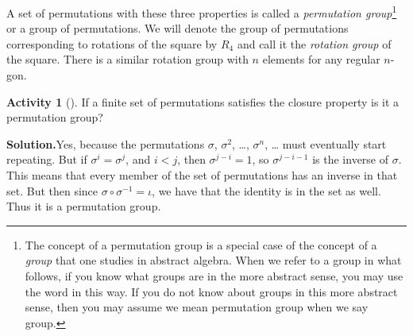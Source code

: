 \documentclass[10pt,]{book}
\theoremstyle{plain}
\theoremstyle{definition}
\newtheorem{activity}[project]{Activity}
\numberwithin{equation}{chapter}
\newcommand{\lt}{<}
\begin{document}
%
\par
A set of permutations with these three properties is called a \emph{permutation group}\footnote{The concept of a permutation group is a special case of the concept of a \emph{group} that one studies in abstract algebra.  When we refer to a group in what follows, if you  know what groups are in the more abstract sense, you may use the word in this way. If you do not know about groups in this more abstract sense, then you may assume we mean permutation group when we say group.\label{fn-18}} or a group of permutations. We will denote the group of permutations corresponding to rotations of the square by \(R_4\) and call it the \emph{rotation group} of the square. There is a similar rotation group with \(n\) elements for any regular \(n\)-gon.%
\begin{activity}[]\label{activity-241}
If a finite set of permutations satisfies the closure property is it a permutation group?%
\par\medskip\noindent%
\textbf{Solution.}\quad Yes, because the permutations \(\sigma\), \(\sigma^2\), \dots{}, \(\sigma^n\), \dots{} must eventually start repeating. But if \(\sigma^i=\sigma^j\), and \(i\lt j\), then \(\sigma^{j-i} =1\), so \(\sigma^{j-i-1}\) is the inverse of \(\sigma\). This means that every member of the set of permutations has an inverse in that set. But then since \(\sigma\circ\sigma^{-1} = \iota\), we have that the identity is in the set as well. Thus it is a permutation group.%
\end{activity}
\end{document}
